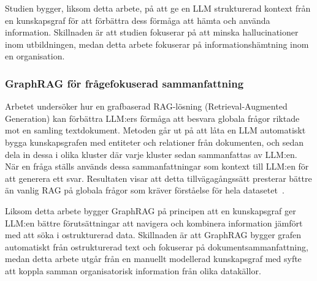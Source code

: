 Studien bygger, liksom detta arbete, på att ge en LLM strukturerad kontext från en kunskapsgraf för att förbättra dess förmåga att hämta och använda information.
Skillnaden är att studien fokuserar på att minska hallucinationer inom utbildningen, medan detta arbete fokuserar på informationshämtning inom en organisation.

\subsubsection{GraphRAG för frågefokuserad sammanfattning}

Arbetet undersöker hur en grafbaserad RAG-lösning (Retrieval-Augmented Generation) kan förbättra LLM:ers förmåga att besvara globala frågor riktade mot en samling textdokument.
Metoden går ut på att låta en LLM automatiskt bygga kunskapsgrafen med entiteter och relationer från dokumenten,
 och sedan dela in dessa i olika kluster där varje kluster sedan sammanfattas av LLM:en.
När en fråga ställs används dessa sammanfattningar som kontext till LLM:en för att generera ett svar.
Resultaten visar att detta tillvägagångssätt presterar bättre än vanlig RAG på globala frågor som kräver förståelse för hela datasetet~\cite{edge2024graphrag}.

Liksom detta arbete bygger GraphRAG på principen att en kunskapsgraf ger LLM:en bättre förutsättningar att navigera och kombinera information jämfört med att söka i ostrukturerad data.
Skillnaden är att GraphRAG bygger grafen automatiskt från ostrukturerad text och fokuserar på dokumentsammanfattning, medan detta arbete utgår från en manuellt modellerad kunskapsgraf med syfte att koppla samman organisatorisk information från olika datakällor.



